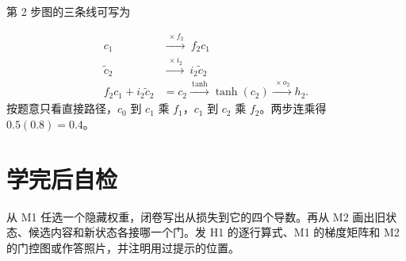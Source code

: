 \documentclass[UTF8,a4paper,11pt]{ctexart}
\begin{document}
第 2 步图的三条线可写为

\[\begin{aligned}
c_1&\xrightarrow{\ \times f_2\ }\ f_2 c_1\\
\tilde c_2&\xrightarrow{\ \times i_2\ }\ i_2\tilde c_2\\
f_2 c_1+i_2\tilde c_2&=c_2\xrightarrow{\ \tanh\ }\tanh(c_2)\xrightarrow{\ \times o_2\ } h_2.
\end{aligned}\]
按题意只看直接路径，$c_0$ 到 $c_1$ 乘 $f_1$，$c_1$ 到 $c_2$ 乘 $f_2$。两步连乘得 $0.5(0.8)=0.4$。

\section{学完后自检}
从 M1 任选一个隐藏权重，闭卷写出从损失到它的四个导数。再从 M2 画出旧状态、候选内容和新状态各接哪一个门。发 H1 的逐行算式、M1 的梯度矩阵和 M2 的门控图或作答照片，并注明用过提示的位置。
\end{document}
